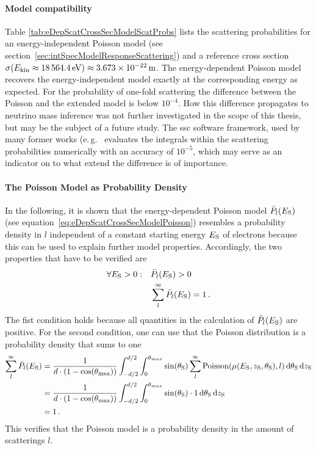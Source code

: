 \paragraph{Model compatibility}
Table \ref{tab:eDepScatCrossSecModelScatProbs} lists the scattering probabilities for an energy-independent Poisson model (see section~\ref{sec:intSpecModelResponseScattering}) and a reference cross section $\sigma(E_\mathrm{kin}\approx\SI{18564.4}{eV})\approx\SI{3.673e-22}{m}$. The energy-dependent Poisson model recovers the energy-independent model exactly at the corresponding energy as expected. For the probability of one-fold scattering the difference between the Poisson and the extended model is below $10^{-4}$. How this difference propagates to neutrino mass inference was not further investigated in the scope of this thesis, but may be the subject of a future study. The \gls{ssc} software framework, used by many former works (e.\,g.~\cite{Groh2015,Kleesiek2014,SeitzM2019} evaluates the integrals within the scattering probabilities numerically with an accuracy of $10^{-5}$, which may serve as an indicator on to what extend the difference is of importance.

\paragraph{The Poisson Model as Probability Density}
In the following, it is shown that the energy-dependent Poisson model $\bar{P}_l(E_\mathrm{S})$ (see equation~\ref{eq:eDepScatCrossSecModelPoisson}) resembles a probability density in $l$ independent of a constant starting energy $E_\mathrm{S}$ of electrons because this can be used to explain further model properties. Accordingly, the two properties that have to be verified are
\begin{align}
	\forall E_\mathrm{S} > 0: \quad
	&\bar{P}_l(E_\mathrm{S}) > 0 \\
	&\sum_{l}^{\infty} \bar{P}_l(E_\mathrm{S}) = 1
	\text{\,.}
\end{align}
The fist condition holds because all quantities in the calculation of $\bar{P}_l(E_\mathrm{S})$ are positive. For the second condition, one can use that the Poisson distribution is a probability density that sums to one
\begin{align*}
	\sum_{l}^{\infty} \bar{P}_l(E_\mathrm{S}) &=
	\frac{1}{d \cdot (1-\cos(\theta_\mathrm{max}))} 
	\int_{-d/2}^{d/2}  
	\int_{0}^{\theta_{max}} 
	\sin(\theta_\mathrm{S})
		\sum_{l}^{\infty}
		\mathrm{Poisson}(\mu(E_\mathrm{S},z_\mathrm{S},\theta_\mathrm{S}),l)
	\mathop{}\!\mathrm{d}\theta_\mathrm{S}
	\mathop{}\!\mathrm{d}z_\mathrm{S} \\  &=
	\frac{1}{d \cdot (1-\cos(\theta_\mathrm{max}))} 
	\int_{-d/2}^{d/2}  
	\int_{0}^{\theta_{max}} 
	\sin(\theta_\mathrm{S})
		\cdot 1
	\mathop{}\!\mathrm{d}\theta_\mathrm{S}
	\mathop{}\!\mathrm{d}z_\mathrm{S} \\ &= 1
	\text{\,.}
\end{align*}
This verifies that the Poisson model is a probability density in the amount of scatterings $l$.

